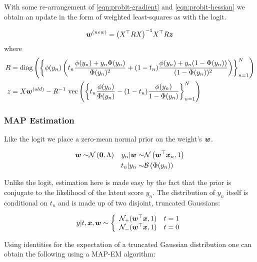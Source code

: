 With some re-arrangement of \eqref{eqn:probit-gradient} and \eqref{eqn:probit-hessian} we obtain an update in the form of weighted least-squares as with the logit.

\begin{align}
\bm w^{(new)} = {\left( X^\top R X \right)}^{-1}X^\top R \bm z
\end{align}
where
\begin{align}
R & = \text{diag} \left( {\left\{ \phi(y_n) \left(
    t_n \frac{\phi(y_n) + y_n \Phi(y_n)}{\Phi(y_n)^2} + (1-t_n) \frac{\phi(y_n) + y_n (1-\Phi(y_n))}{(1 - \Phi(y_n))^2}
\right) \right\}_{n=1}^N} \right) \\
z & = X \bm w^{(old)}  - {R}^{-1} \text{ vec} \left(\left\{ t_n \frac{\phi(y_n)}{\Phi(y_n)} - (1 - t_n) \frac{\phi(y_n)}{1 - \Phi(y_n)} \right\}_{n=1}^N\right)
\end{align}



\subsubsection*{MAP Estimation}
Like the logit we place a zero-mean normal prior on the weight's $\bm w$.

\begin{align}
\bm w \sim & \mathcal{N} \left( {\bm 0}, {\Lambda} \right) & y_n | \bm w \sim & \mathcal{N} \left( {\bm w^\top\bm x_n}, {1} \right) \\
\text{ } & \text{ } & t_n | y_n \sim & \mathcal{B}\left( \Phi(y_n) \right)
\end{align}

Unlike the logit, estimation here is made easy by the fact that the prior is conjugate to the likelihood of the latent score $y_n$. The distribution of $y_n$ itself is conditional on $t_n$ and is made up of two disjoint, truncated Gaussians:

\begin{align}
y | t, \bm x, \bm w \sim \left\{ \begin{array}{lr} \mathcal{N}_+ (\bm w^\top\bm x, 1) & t = 1 \\
\mathcal{N}_- (\bm w^\top\bm x, 1) & t = 0
 \end{array} \right.
\end{align}

Using identities for the expectation of a truncated Gaussian distribution one can obtain the following using a MAP-EM algorithm\cite{Figueiredo2003}\cite{Armagan2011}:

